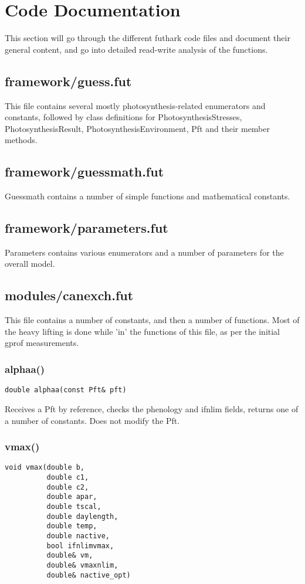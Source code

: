 \section{Code Documentation}
This section will go through the different futhark code files and document their general content, and go into detailed read-write analysis of the functions.
\subsection{framework/guess.fut}
This file contains several mostly photosynthesis-related enumerators and constants, followed by class definitions for PhotosynthesisStresses, PhotosynthesisResult, PhotosynthesisEnvironment, Pft and their member methods.
\subsection{framework/guessmath.fut}
Guessmath contains a number of simple functions and mathematical constants.
\subsection{framework/parameters.fut}
Parameters contains various enumerators and a number of parameters for the overall model.
\subsection{modules/canexch.fut}
This file contains a number of constants, and then a number of functions. Most of the heavy lifting is done while 'in' the functions of this file, as per the initial gprof measurements.

\subsubsection{alphaa()}
\begin{verbatim}
double alphaa(const Pft& pft)
\end{verbatim}

Receives a Pft by reference, checks the phenology and ifnlim fields, returns one of a number of constants. Does not modify the Pft.
\subsubsection{vmax()}

\begin{verbatim}
void vmax(double b,
          double c1,
          double c2,
          double apar,
          double tscal,
          double daylength,
          double temp,
          double nactive,
          bool ifnlimvmax,
          double& vm,
          double& vmaxnlim,
          double& nactive_opt)
\end{verbatim}

